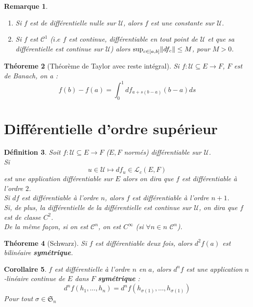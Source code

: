 \documentclass[a4paper, oneside]{report}
\theoremstyle{break}
\newtheorem{thm}{Théoreme}[section] %
\newtheorem{defi}[thm]{Définition}
\newtheorem{cor}[thm]{Corollaire}
\newtheorem{remar}[thm]{Remarque}
\newcommand{\U}{\mathcal{U}}
\renewcommand{\L}{\mathcal{L}}
\renewcommand{\S}{\mathfrak{S}}
\DeclarePairedDelimiter\norm{\lVert}{\rVert}%
\begin{document}
\begin{remar}
\begin{enumerate}
\item Si $f$ est de différentielle nulle sur $\U$, alors $f$ est une constante sur $\U$.
\item Si $f$ est $\mathcal{C}^1$ ($i.e$ $f$ est continue, différentiable en tout point de $\U$ et que sa différentielle est continue sur $\U$) alors $\sup_{c \in [a,b]}\norm{df_c} \leq M$, pour $M>0$.
\end{enumerate}
\end{remar}

\begin{thm}[Théorème de Taylor avec reste intégral]
Si $f :\U \subseteq E \rightarrow F$, $F$ est de Banach, on a :
$$f(b)-f(a)=\int_0^1df_{a+s(b-a)}(b-a)ds$$
\end{thm}

\section{Différentielle d'ordre supérieur}

\begin{defi}
Soit $f: \U \subseteq E \rightarrow F$ ($E,F$ normés) différentiable sur $\U$.\\
Si 
$$u\in \U \mapsto df_u\in \L_c(E,F)$$
est une application différentiable sur $E$ alors on dira que $f$ est différentiable à l'ordre $2$.\\
Si $df$ est différentiable à l'ordre $n$, alors $f$ est différentiable à l'ordre $n+1$.\\
Si, de plus, la différentielle de la différentielle est continue sur $\U$, on dira que $f$ est de classe $C^2$.\\
De la même façon, si on est $\mathcal{C}^n$, on est $C^\infty$ (si $\forall n \in n$ $\mathcal{C}^n$).
\end{defi}

\begin{thm}[Schwarz]
Si $f$ est différentiable deux fois, alors $d^2f(a)$ est bilinéaire \textbf{symétrique}.
\end{thm}

\begin{cor}
$f$ est différentielle à l'ordre $n$ en $a$, alors $d^nf$ est une application $n$-linéaire continue de $E$ dans $F$ \textbf{symétrique} :
$$d^nf(h_1,\ldots, h_n) = d^nf(h_{\sigma(1)},\ldots, h_{\sigma(1)})$$
Pour tout $\sigma \in \S_n$
\end{cor}
\end{document}
